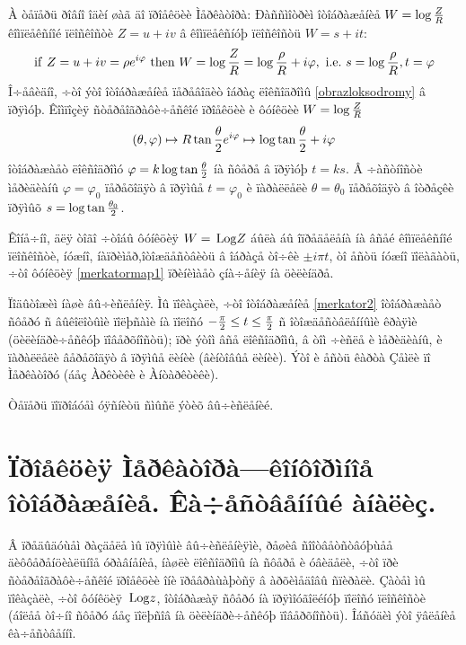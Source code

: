 \documentclass[12pt,a4paper]{amsart}
\def\Log {{\rm \, Log}}
\begin{document}
{   À òåïåðü ðîâíî îäèí øàã äî ïðîåêöèè Ìåðêàòîðà:
   Ðàññìîòðèì îòîáðàæåíèå $W=\log {Z\over R}$ êîìïëåêñíîé ïëîñêîñòè $Z=u+iv$
    â êîìïëåêñíóþ ïëîñêîñòü   $W=s+it$:
         \begin{equation}\label{merkatormap1}
        {\rm if}\,\, Z=u+iv=\rho e^{i\varphi}\,\,{\rm then}\,\,
        W=\log {Z\over R}=\log {\rho\over R}+i\varphi, \,\, {\rm i.e.}\,\,
            s=\log {\rho\over R}, t=\varphi
    \end{equation}
  Î÷åâèäíî, ÷òî ýòî îòîáðàæåíèå  ïåðåâîäèò îáðàç ëîêñîäðîìû
  \eqref{obrazloksodromy} â ïðÿìóþ.
  Êîìïîçèÿ ñòåðåîãðàôè÷åñêîé ïðîåêöèè è ôóíêöèè $W=\log {Z\over R}$
\begin{equation}\label{merkator2}
    (\theta,\varphi)\mapsto R\tan{\theta\over 2} e^{i\varphi}\mapsto \log \tan{\theta\over 2}+i\varphi
\end{equation}
îòîáðàæàåò ëîêñîäðîìó $\varphi=k\log\tan {\theta\over 2}$
íà ñôåðå â ïðÿìóþ  $t=ks$.  Â ÷àñòíîñòè ìåðèäèàíû $\varphi=\varphi_0$ ïåðåõîäÿò â ïðÿìûå $t=\varphi_0$
è ïàðàëëåëè $\theta=\theta_0$ ïåðåõîäÿò â îòðåçêè ïðÿìûõ $s=\log \tan {\theta_0\over 2}$.


    Êîíå÷íî, äëÿ òîãî ÷òîáû ôóíêöèÿ $W=\Log  Z$ áûëà áû îïðåäåëåíà íà âñåé êîìïëåêñíîé ïëîñêîñòè,
    íóæíî, íàïðèìåð,îòîæäåñòâèòü
    â îáðàçå òî÷êè $\pm i\pi t$,  òî åñòü íóæíî ïîëàãàòü, ÷òî ôóíêöèÿ \eqref{merkatormap1}
      ïðèíèìàåò çíà÷åíèÿ íà öèëèíäðå.


Ïîäûòîæèì íàøè âû÷èñëåíèÿ. Ìû ïîêàçàëè, ÷òî îòîáðàæåíèå  \eqref{merkator2}
îòîáðàæàåò ñôåðó ñ âûêîëîòûìè ïîëþñàìè  íà ïîëîñó $-{\pi\over 2}\leq t \leq {\pi\over 2}$
ñ îòîæäåñòâëåííûìè êðàÿìè (öèëèíäðè÷åñêóþ ïîâåðõíîñòü); ïðè ýòîì  âñå ëîêñîäðîìû, â òîì ÷èñëå
è ìåðèäèàíû, è ïàðàëëåëè âåðåõîäÿò â ïðÿìûå ëèíèè (âèíòîâûå ëèíèè).
 Ýòî è åñòü êàðòà Çåìëè ïî Ìåðêàòîðó (áåç Àðêòèêè è Àíòàðêòèêè).

 Òåïåðü ïîïðîáóåì óÿñíèòü ñìûñë ýòèõ âû÷èñëåíèé.

\section {Ïðîåêöèÿ Ìåðêàòîðà---êîíôîðìíîå îòîáðàæåíèå. Êà÷åñòâåííûé àíàëèç.}

   Â ïðåäûäóùåì ðàçäåëå ìû ïðÿìûìè âû÷èñëåíèÿìè, ðåøèâ ñîîòâåòñòâóþùåå äèôôåðåíöèàëüíîå
   óðàâíåíèå, íàøëè ëîêñîäðîìû íà ñôåðå è óâèäåëè, ÷òî ïðè
   ñòåðåîãðàôè÷åñêîé ïðîåêöèè îíè ïðåâðàùàþòñÿ â àðõèìåäîâû ñïèðàëè.
   Çàòåì ìû ïîêàçàëè, ÷òî ôóíêöèÿ $\Log z$, îòîáðàæàÿ ñôåðó íà
   ïðÿìîóãîëéíóþ ïîëîñó ïëîñêîñòè (áîëåå òî÷íî ñôåðó áåç ïîëþñîâ íà öèëèíäðè÷åñêóþ
   ïîâåðõíîñòü). Îáñóäèì ýòî ÿâëåíèå êà÷åñòâåííî.


}
\end{document}
